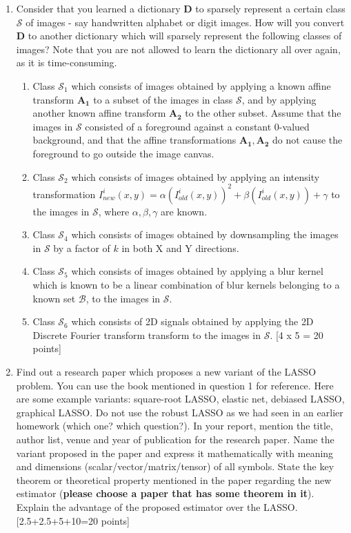 \documentclass[11pt]{article}
\begin{document}
\begin{enumerate}
\item Consider that you learned a dictionary $\boldsymbol{D}$ to sparsely represent a certain class $\mathcal{S}$ of images - say handwritten alphabet or digit images. How will you convert $\boldsymbol{D}$ to another dictionary which will sparsely represent the following classes of images? Note that you are not allowed to learn the dictionary all over again, as it is time-consuming. 
\begin{enumerate}
\item Class $\mathcal{S}_1$ which consists of images obtained by applying a known affine transform $\boldsymbol{A_1}$ to a subset of the images in class $\mathcal{S}$, and by applying another known affine transform $\boldsymbol{A_2}$ to the other subset. Assume that the images in $\mathcal{S}$ consisted of a foreground against a constant 0-valued background, and that the affine transformations $\boldsymbol{A_1}, \boldsymbol{A_2}$ do not cause the foreground to go outside the image canvas. 
\item Class $\mathcal{S}_2$ which consists of images obtained by applying an intensity transformation $I^i_{new}(x,y) = \alpha (I^i_{old}(x,y))^2 + \beta (I^i_{old}(x,y)) + \gamma$ to the images in $\mathcal{S}$, where $\alpha,\beta,\gamma$ are known.  
\item Class $\mathcal{S}_4$ which consists of images obtained by downsampling the images in $\mathcal{S}$ by a factor of $k$ in both X and Y directions. 
\item Class $\mathcal{S}_5$ which consists of images obtained by applying a blur kernel which is known to be a linear combination of blur kernels belonging to a known set $\mathcal{B}$, to the images in $\mathcal{S}$. 
\item Class $\mathcal{S}_6$ which consists of 2D signals obtained by applying the 2D Discrete Fourier transform transform to the images in $\mathcal{S}$. 
\textsf{[4 x 5 = 20 points]}
\end{enumerate}

\item Find out a research paper which proposes a new variant of the LASSO problem. You can use the book mentioned in question 1 for reference. Here are some example variants: square-root LASSO, elastic net, debiased LASSO, graphical LASSO. Do not use the robust LASSO as we had seen in an earlier homework (which one? which question?). In your report, mention the title, author list, venue and year of publication for the research paper. Name the variant proposed in the paper and express it mathematically with meaning and dimensions (scalar/vector/matrix/tensor) of all symbols. State the key theorem or theoretical property mentioned in the paper regarding the new estimator (\textbf{please choose a paper that has some theorem in it}). Explain the advantage of the proposed estimator over the LASSO. \textsf{[2.5+2.5+5+10=20 points]}  


\end{enumerate}
\end{document}
